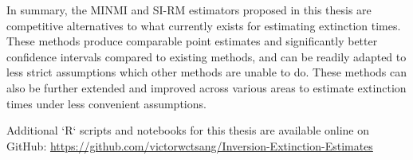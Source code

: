 In summary, the MINMI and SI-RM estimators proposed in this thesis are competitive alternatives to what currently exists for estimating extinction times. These methods produce comparable point estimates and significantly better confidence intervals compared to existing methods, and can be readily adapted to less strict assumptions which other methods are unable to do. These methods can also be further extended and improved across various areas to estimate extinction times under less convenient assumptions.

Additional `R` scripts and notebooks for this thesis are available online on GitHub: \url{https://github.com/victorwctsang/Inversion-Extinction-Estimates}